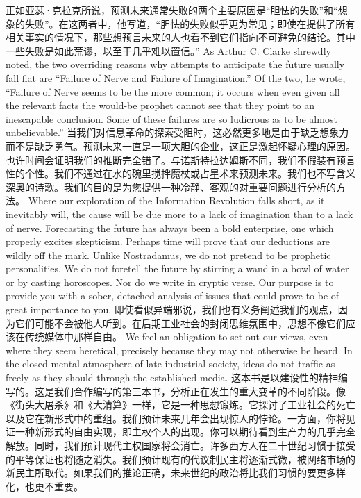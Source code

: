 \begin{paracol}{2}
\switchcolumn*
正如亚瑟·克拉克所说，预测未来通常失败的两个主要原因是“胆怯的失败”和“想象的失败”。在这两者中，他写道，“胆怯的失败似乎更为常见；即使在提供了所有相关事实的情况下，那些想预言未来的人也看不到它们指向不可避免的结论。其中一些失败是如此荒谬，以至于几乎难以置信。”
\switchcolumn
As Arthur C. Clarke shrewdly noted, the two overriding reasons why attempts to anticipate the future usually fall flat are ``Failure of Nerve and Failure of Imagination.'' Of the two, he wrote, ``Failure of Nerve seems to be the more common; it occurs when even given all the relevant facts the would-be prophet cannot see that they point to an inescapable conclusion. Some of these failures are so ludicrous as to be almost unbelievable.''
\switchcolumn*
当我们对信息革命的探索受阻时，这必然更多地是由于缺乏想象力而不是缺乏勇气。预测未来一直是一项大胆的企业，这正是激起怀疑心理的原因。也许时间会证明我们的推断完全错了。与诺斯特拉达姆斯不同，我们不假装有预言性的个性。我们不通过在水的碗里搅拌魔杖或占星术来预测未来。我们也不写含义深奥的诗歌。我们的目的是为您提供一种冷静、客观的对重要问题进行分析的方法。
\switchcolumn
Where our exploration of the Information Revolution falls short, as it inevitably will, the cause will be due more to a lack of imagination than to a lack of nerve. Forecasting the future has always been a bold enterprise, one which properly excites skepticism. Perhaps time will prove that our deductions are wildly off the mark. Unlike Nostradamus, we do not pretend to be prophetic personalities. We do not foretell the future by stirring a wand in a bowl of water or by casting horoscopes. Nor do we write in cryptic verse. Our purpose is to provide you with a sober, detached analysis of issues that could prove to be of great importance to you. 
\switchcolumn*
即使看似异端邪说，我们也有义务阐述我们的观点，因为它们可能不会被他人听到。在后期工业社会的封闭思维氛围中，思想不像它们应该在传统媒体中那样自由。
\switchcolumn
We feel an obligation to set out our views, even where they seem heretical, precisely because they may not otherwise be heard. In the closed mental atmosphere of late industrial society, ideas do not traffic as freely as they should through the established media.
\switchcolumn*
这本书是以建设性的精神编写的。这是我们合作编写的第三本书，分析正在发生的重大变革的不同阶段。像《街头大屠杀》和《大清算》一样，它是一种思想锻炼。它探讨了工业社会的死亡以及它在新形式中的重组。我们预计未来几年会出现惊人的悖论。一方面，你将见证一种新形式的自由实现，即主权个人的出现。你可以期待看到生产力的几乎完全解放。同时，我们预计现代主权国家将会消亡。许多西方人在二十世纪习惯于接受的平等保证也将随之消失。我们预计现有的代议制民主将逐渐式微，被网络市场的新民主所取代。如果我们的推论正确，未来世纪的政治将比我们习惯的要更多样化，也更不重要。

\end{paracol}
